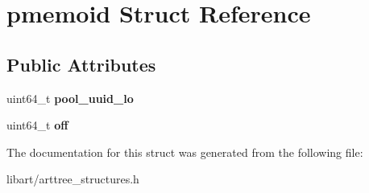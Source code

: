 \hypertarget{structpmemoid}{}\section{pmemoid Struct Reference}
\label{structpmemoid}
\subsection*{Public Attributes}
\begin{DoxyCompactItemize}
\item 
\mbox{\label{structpmemoid_a49854abb61239c13aaf93fe098553ca7}} 
uint64\+\_\+t {\bfseries pool\+\_\+uuid\+\_\+lo}
\item 
\mbox{\label{structpmemoid_a45aa87cdfa16aa3e90c2fa45fe34627f}} 
uint64\+\_\+t {\bfseries off}
\end{DoxyCompactItemize}


The documentation for this struct was generated from the following file\+:\begin{DoxyCompactItemize}
\item 
libart/arttree\+\_\+structures.\+h\end{DoxyCompactItemize}
